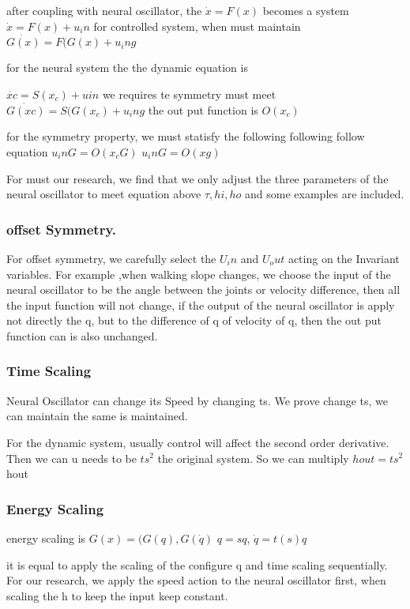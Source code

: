 after coupling with neural oscillator, the $\dot{x}=F(x)$ becomes a system 
$\dot{x}=F(x)+u_in$
for controlled system, when must maintain
$\dot{G(x)}=F(G(x)+u_ing$

for the neural system
the the dynamic equation is

$\dot{xc}=S(x_c)+uin$
we requires te symmetry must meet
$\dot{G(xc)}=S(G(x_c)+u_ing$
the out put function is
$O(x_c)$


for the symmetry property, we must statisfy the following following follow equation
$u_inG=O(x_cG)$
$u_inG=O(xg)$

For must our research, we find that we only adjust the three parameters of the neural oscillator to meet equation above
$\tau,hi,ho$
and some examples are included.

\subsubsection*{ offset Symmetry.}
For offset symmetry, we carefully select the $U_in$ and $U_out$ acting on the Invariant variables.
For example ,when walking slope changes, we choose the input of the neural oscillator to be the angle between the joints or velocity difference,
then all the input function will not change, if the output of the neural oscillator is apply not directly the q, but to the difference of q of velocity of q,
then the out put function can is also unchanged.


\subsubsection*{Time Scaling}
Neural Oscillator can change its Speed by changing ts.
We prove change ts, we can maintain the same is maintained.

For the dynamic system, usually control will affect the second order derivative.
Then we can u needs to be $ts^2$ the original system.
So we can multiply $hout=ts^2$ hout

\subsubsection*{ Energy Scaling}
energy scaling is $G(x)=(G(q),G(\dot{q})$
$q=sq$,
$\dot{q}=t(s)q$

it is equal to apply the scaling of the configure q and time scaling sequentially.
For our research, we apply the speed action to the neural oscillator first,
when scaling the h to keep the input keep constant.


